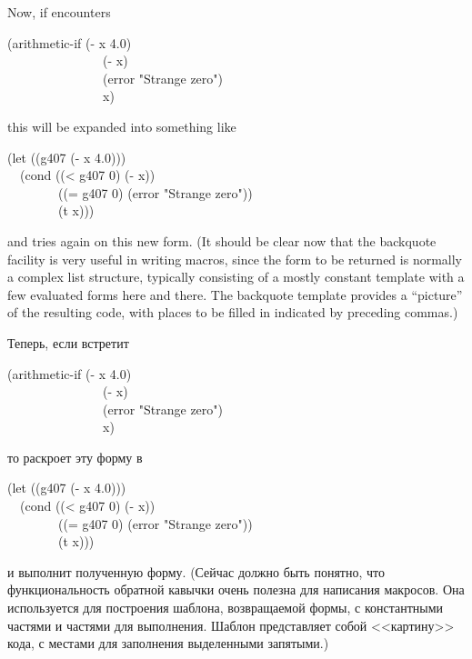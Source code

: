 \begin{defmac}
Now, if  encounters
\begin{lisp}
(arithmetic-if (- x 4.0) \\
~~~~~~~~~~~~~~~(- x) \\
~~~~~~~~~~~~~~~(error "Strange zero") \\
~~~~~~~~~~~~~~~x)
\end{lisp}
this will be expanded into something like
\begin{lisp}
(let ((g407 (- x 4.0))) \\
~~(cond ((< g407 0) (- x)) \\
~~~~~~~~((= g407 0) (error "Strange zero")) \\
~~~~~~~~(t x)))
\end{lisp}
and  tries again on this new form.
(It should be clear now that the backquote facility
is very useful in writing macros, since the form to be returned is
normally a complex list structure, typically consisting of a
mostly constant template with a few evaluated forms here and there.
The backquote template provides a ``picture'' of the resulting
code, with places to be filled in indicated by preceding commas.)

Теперь, если  встретит
\begin{lisp}
(arithmetic-if (- x 4.0) \\
~~~~~~~~~~~~~~~(- x) \\
~~~~~~~~~~~~~~~(error "Strange zero") \\
~~~~~~~~~~~~~~~x)
\end{lisp}
то раскроет эту форму в
\begin{lisp}
(let ((g407 (- x 4.0))) \\
~~(cond ((< g407 0) (- x)) \\
~~~~~~~~((= g407 0) (error "Strange zero")) \\
~~~~~~~~(t x)))
\end{lisp}
и  выполнит полученную форму.
(Сейчас должно быть понятно, что функциональность обратной кавычки очень полезна
для написания макросов. Она используется для построения шаблона, возвращаемой
формы, с константными частями и частями для выполнения. Шаблон представляет
собой <<картину>> кода, с местами для заполнения выделенными запятыми.)


\end{defmac}

